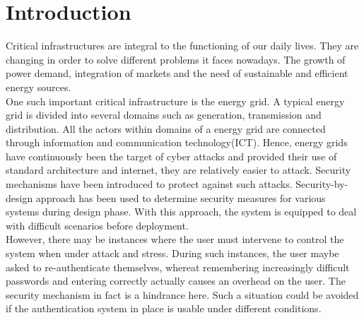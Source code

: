 \section{Introduction}

Critical infrastructures are integral to the functioning of our daily lives. They are changing in order to solve different problems it faces nowadays. The growth of power demand, integration of markets and the need of sustainable and efficient energy sources. \\
One such important critical infrastructure is the energy grid. A typical energy grid is divided into several domains such as generation, transmission and distribution. All the actors within domains of a energy grid are connected through information and communication technology(ICT). Hence, energy grids have continuously been the target of cyber attacks and provided their use of standard architecture and internet, they are relatively easier to attack. Security mechanisms have been introduced to protect against such attacks. Security-by-design approach has been used to determine security measures for various systems during design phase. With this approach, the system is equipped to deal with difficult scenarios before deployment. \\ However, there may be instances where the user must intervene to control the system when under attack and stress. During such instances, the user maybe asked to re-authenticate themselves, whereat remembering increasingly difficult passwords and entering correctly actually causes an overhead on the user. The security mechanism in fact is a hindrance here. Such a situation could be avoided if the authentication system in place is usable under different conditions.


